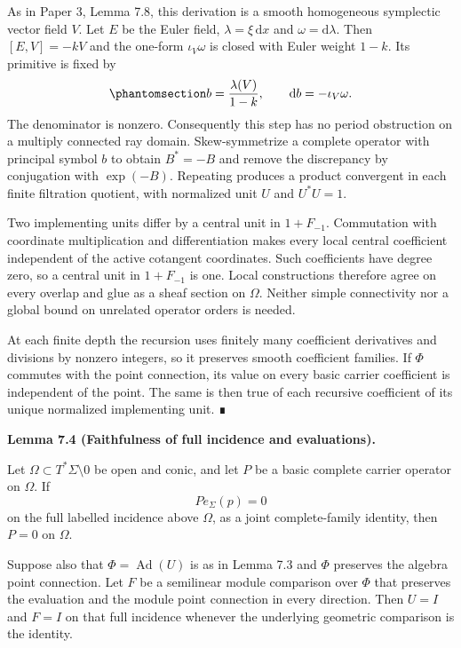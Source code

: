 \documentclass[
  english,
  11pt,
  reqno]{amsart}
\makeatletter
\newcommand{\pandocstatementheading}[1]{%
  \par\addpenalty{\@beginparpenalty}%
  \addvspace{.5\baselineskip plus .2\baselineskip minus .2\baselineskip}%
  {\normalfont\bfseries #1\par}%
  \nobreak\@afterindenttrue\@afterheading
}
\makeatother
\begin{document}
As in Paper 3, Lemma 7.8, this derivation is a smooth homogeneous
symplectic vector field \(V\). Let \(E\) be the Euler field,
\(\lambda=\xi\,\mathrm dx\) and \(\omega=\mathrm d\lambda\). Then
\([E,V]=-kV\) and the one-form \(\iota_V\omega\) is closed with Euler
weight \(1-k\). Its primitive is fixed by
\begin{equation}\protect\phantomsection\label{eq:global-negative-weight-primitive}{
b=\frac{\lambda(V)}{1-k},
\qquad
\mathrm db=-\iota_V\omega.
}\end{equation} The denominator is nonzero. Consequently this step has
no period obstruction on a multiply connected ray domain.
Skew-symmetrize a complete operator with principal symbol \(b\) to
obtain \(B^*=-B\) and remove the discrepancy by conjugation with
\(\exp(-B)\). Repeating produces a product convergent in each finite
filtration quotient, with normalized unit \(U\) and \(U^*U=1\).

Two implementing units differ by a central unit in \(1+F_{-1}\).
Commutation with coordinate multiplication and differentiation makes
every local central coefficient independent of the active cotangent
coordinates. Such coefficients have degree zero, so a central unit in
\(1+F_{-1}\) is one. Local constructions therefore agree on every
overlap and glue as a sheaf section on \(\Omega\). Neither simple
connectivity nor a global bound on unrelated operator orders is needed.

At each finite depth the recursion uses finitely many coefficient
derivatives and divisions by nonzero integers, so it preserves smooth
coefficient families. If \(\Phi\) commutes with the point connection,
its value on every basic carrier coefficient is independent of the
point. The same is then true of each recursive coefficient of its unique
normalized implementing unit. ∎

\pandocstatementheading{\protect{}\label{lem:global-full-incidence-faithfulness}Lemma 7.4 (Faithfulness of full incidence and evaluations).}

Let \(\Omega\subset T^*\Sigma\setminus0\) be open and conic, and let
\(P\) be a basic complete carrier operator on \(\Omega\). If \[
P e_\Sigma(p)=0
\] on the full labelled incidence above \(\Omega\), as a joint
complete-family identity, then \(P=0\) on \(\Omega\).

Suppose also that \(\Phi=\operatorname{Ad}(U)\) is as in Lemma 7.3 and
\(\Phi\) preserves the algebra point connection. Let \(F\) be a
semilinear module comparison over \(\Phi\) that preserves the evaluation
and the module point connection in every direction. Then \(U=I\) and
\(F=I\) on that full incidence whenever the underlying geometric
comparison is the identity.
\end{document}
